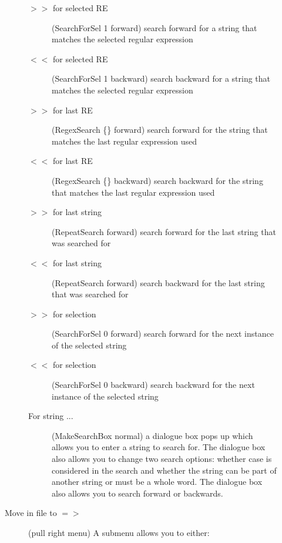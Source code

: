 \begin{description}
\begin{description}
	\begin{description}

		\item[$>>$ for selected RE] (SearchForSel 1 forward)
			search forward for a string that matches the
			selected regular expression

		\item[$<<$ for selected RE] (SearchForSel 1 backward)
			search backward for a string that matches the
			selected regular expression

		\item[$>>$ for last RE] (RegexSearch \{\} forward)
			search forward for the string that
			matches the last regular expression used

		\item[$<<$ for last RE] (RegexSearch \{\} backward)
			search backward for the string that
			matches the last regular expression used

		\item[$>>$ for last string] (RepeatSearch forward)
			search forward for the last
			string that was searched for

		\item[$<<$ for last string] (RepeatSearch forward)
			search backward for the last
			string that was searched for

		\item[$>>$ for selection] (SearchForSel 0 forward)
			search forward for the next
			instance of the selected string

		\item[$<<$ for selection] (SearchForSel 0 backward)
			search backward for the next
			instance of the selected string

		\item[For string ...] (MakeSearchBox normal)
			a dialogue box pops
			up which allows you to enter a string to search for.
			The dialogue box also allows you to change two
			search options: whether case is considered in
			the search and whether the string can be part
			of another string or must be a whole word.
			The dialogue box also allows you to search
			forward or backwards.

	\end{description}

	\item[Move in file to $=>$] (pull right menu)
	A submenu allows you to either:

	\begin{description}


\end{description}
\end{description}
\end{description}
